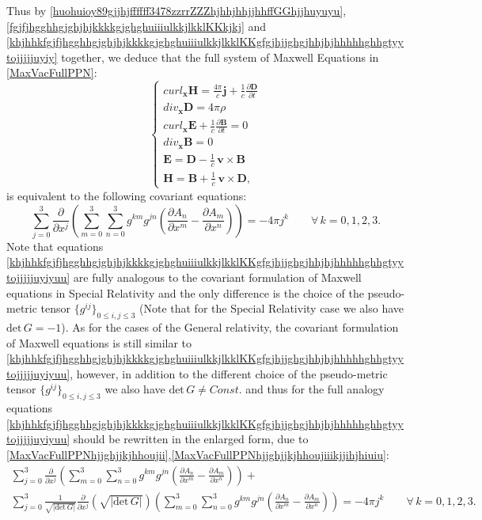 \documentclass{article}
\theoremstyle{definition}
\theoremstyle{remark}
\renewcommand{\vec}[1]{\mathbf{#1}}
\newcommand{\er}{\eqref}
\newcommand{\er}{\eqref}
\begin{document}
Thus by
\er{huohuioy89gjjhjffffff3478zzrrZZZhjhhjhhjjhhffGGhjjhuyuyu},
\er{fgjfjhgghhgjghjhjkkkkgjghghuiiiulkkjlkklKKkjkj} and
\er{khjhhkfgjfjhgghhgjghjhjkkkkgjghghuiiiulkkjlkklKKgfgjhjjghgjhhjhjhhhhhghhgtyytojjjjjuyiy}
together, we deduce that the full system of Maxwell Equations in
\er{MaxVacFullPPN}:
\begin{equation}\label{MaxVacFullPPNhjjghyghghiyyhh}
\begin{cases}
curl_{\vec x} \vec H=\frac{4\pi}{c}\vec j+\frac{1}{c}\frac{\partial \vec D}{\partial t}\\
div_{\vec x} \vec D=4\pi\rho\\
curl_{\vec x} \vec E+\frac{1}{c}\frac{\partial \vec B}{\partial t}=0\\
div_{\vec x} \vec B=
0\\
\vec E=\vec D-\frac{1}{c}\,\vec v\times
\vec B\\
\vec H=\vec B+\frac{1}{c}\,\vec v\times \vec D,
\end{cases}
\end{equation}
is equivalent to the following covariant equations:
\begin{equation}\label{khjhhkfgjfjhgghhgjghjhjkkkkgjghghuiiiulkkjlkklKKgfgjhjjghgjhhjhjhhhhhghhgtyytojjjjjuyiyuu}
\sum_{j=0}^{3}\frac{\partial}{\partial
x^j}\left(\sum_{m=0}^{3}\sum_{n=0}^{3}g^{km}g^{jn}\left(\frac{\partial
A_n}{\partial x^m}-\frac{\partial A_m}{\partial
x^n}\right)\right)=-4\pi j^k\quad\quad\forall\, k=0,1,2,3.
\end{equation}
Note that equations
\er{khjhhkfgjfjhgghhgjghjhjkkkkgjghghuiiiulkkjlkklKKgfgjhjjghgjhhjhjhhhhhghhgtyytojjjjjuyiyuu}
are fully analogous to the covariant formulation of Maxwell
equations in Special Relativity and the only difference is the
choice of the pseudo-metric tensor $\{g^{ij}\}_{0\leq i,j\leq 3}$
(Note that for the Special Relativity case we also have
$\text{det}\,G=-1$). As for the cases of the General relativity, the
covariant formulation of Maxwell equations is still similar to
\er{khjhhkfgjfjhgghhgjghjhjkkkkgjghghuiiiulkkjlkklKKgfgjhjjghgjhhjhjhhhhhghhgtyytojjjjjuyiyuu},
however, in addition to the different choice of the pseudo-metric
tensor $\{g^{ij}\}_{0\leq i,j\leq 3}$ we also have
$\text{det}\,G\neq Const.$ and thus for the full analogy equations
\er{khjhhkfgjfjhgghhgjghjhjkkkkgjghghuiiiulkkjlkklKKgfgjhjjghgjhhjhjhhhhhghhgtyytojjjjjuyiyuu}
should be rewritten in the enlarged form, due to
\er{MaxVacFullPPNhjjghjjkjhhoujii},\er{MaxVacFullPPNhjjghjjkjhhoujiiikjjihjhiuiu}:
\begin{multline}\label{khjhhkfgjfjhgghhgjghjhjkkkkgjghghuiiiulkkjlkklKKgfgjhjjghgjhhjhjhhhhhghhgtyytojjjjjuyiyuughgfg}
\sum_{j=0}^{3}\frac{\partial}{\partial
x^j}\left(\sum_{m=0}^{3}\sum_{n=0}^{3}g^{km}g^{jn}\left(\frac{\partial
A_n}{\partial x^m}-\frac{\partial A_m}{\partial
x^n}\right)\right)+\\
\sum_{j=0}^{3}\frac{1}{\sqrt{|\text{det}\,G|}}\frac{\partial}{\partial
x^j}\left(\sqrt{|\text{det}\,G|}\right)\left(\sum_{m=0}^{3}\sum_{n=0}^{3}g^{km}g^{jn}\left(\frac{\partial
A_n}{\partial x^m}-\frac{\partial A_m}{\partial x^n}\right)\right)
=-4\pi j^k\quad\quad\forall\, k=0,1,2,3.
\end{multline}
\end{document}

